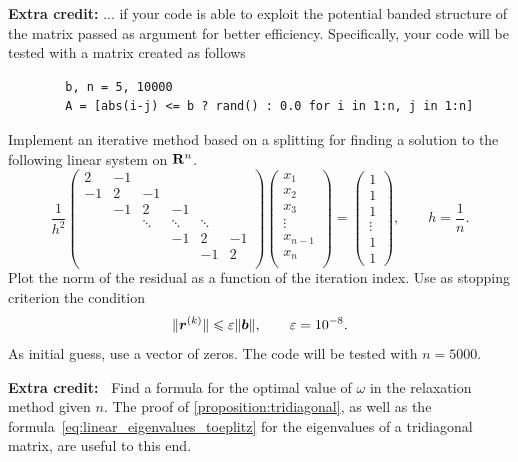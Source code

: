 \begin{exercise}
    \noindent \textbf{Extra credit:} ... if your code is able to exploit the potential banded structure of the matrix passed as argument for better efficiency.
    Specifically, your code will be tested with a matrix created as follows
    \begin{verbatim}
        b, n = 5, 10000
        A = [abs(i-j) <= b ? rand() : 0.0 for i in 1:n, j in 1:n]
    \end{verbatim}
\end{exercise}

\begin{compexercise}
    \label{exercise:one_dim_finite_difference}
    Implement an iterative method based on a splitting for finding a solution to the following linear system on $\mathbf R^n$.
    \[
        \frac{1}{h^2}
        \begin{pmatrix}
            2 & -1 \\
            -1 & 2  & -1 \\
               & -1 & 2      & -1 \\
               &    & \ddots & \ddots & \ddots & \\
               &    &        & -1    & 2      & -1 \\
               &    &        &     & -1      & 2 \\
        \end{pmatrix}
        \begin{pmatrix}
            x_1 \\
            x_2 \\
            x_3 \\
            \vdots \\
            x_{n-1} \\
            x_n \\
        \end{pmatrix}
        =
        \begin{pmatrix}
            1 \\
            1 \\
            1 \\
            \vdots \\
            1 \\
            1
        \end{pmatrix},
        \qquad
        h = \frac{1}{n}.
    \]
    Plot the norm of the residual as a function of the iteration index.
    Use as stopping criterion the condition
    \[
        \lVert\mathbf{\boldsymbol{r}}^{(k)}\rVert \leqslant \varepsilon \lVert\mathbf{\boldsymbol{b}}\rVert,
        \qquad \varepsilon = 10^{-8}.
    \]
    As initial guess, use a vector of zeros.
    The code will be tested with $n = 5000$.

    \vspace{.2cm}
    \noindent \textbf{Extra credit:~\moreinfo} Find a formula for the optimal value of $\omega$ in the relaxation method given $n$.
    The proof of \cref{proposition:tridiagonal},
    as well as the formula~\eqref{eq:linear_eigenvalues_toeplitz} for the eigenvalues of a tridiagonal matrix,
    are useful to this end.
\end{compexercise}


